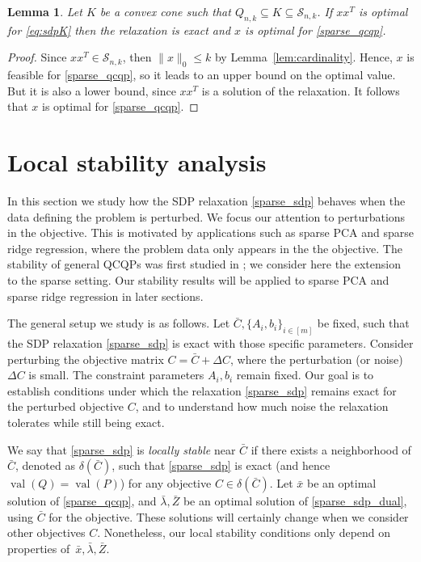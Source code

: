 \documentclass[11pt]{amsart}
\newcommand{\Szero}[2]{\ensuremath{\mathcal{S}_{#1,#2}}}
\theoremstyle{plain}
\newtheorem{lem}{Lemma}[section]
\theoremstyle{definition}
\theoremstyle{remark}
\DeclareMathOperator{\val}{val}
\begin{document}
	\begin{lem}
		Let $K$ be a convex cone such that $Q_{n,k} \subseteq K\subseteq \Szero{n}{k}$.
		If $x x^T$ is optimal for \eqref{eq:sdpK} then the relaxation is exact and $x$ is optimal for \eqref{sparse_qcqp}.
	\end{lem}
	
	\begin{proof}
		Since $x x^T \in \Szero{n}{k}$, then $\|x\|_0 \leq k$ by Lemma~\ref{lem:cardinality}.
		Hence, $x$ is feasible for \eqref{sparse_qcqp},
		so it leads to an upper bound on the optimal value.
		But it is also a lower bound, since $x x^T$ is a solution of the relaxation.
		It follows that $x$ is optimal for \eqref{sparse_qcqp}.
	\end{proof}
	
	\section{Local stability analysis}\label{section:stability}
	
	In this section we study how the SDP relaxation \eqref{sparse_sdp} behaves when the data defining the problem is perturbed.
	We focus our attention to perturbations in the objective.
	This is motivated by applications such as sparse PCA and sparse ridge regression, where the problem data only appears in the the objective.
	The stability of general QCQPs was first studied in \cite{cifuentes2022local};
	we consider here the extension to the sparse setting.
	Our stability results will be applied to sparse PCA and sparse ridge regression in later sections.
	
	The general setup we study is as follows.
	Let $\bar C, \{A_i,b_i\}_{i \in [m]}$ be fixed, such that the SDP relaxation \eqref{sparse_sdp} is exact with those specific parameters.
	Consider perturbing the objective matrix $C = \bar C + \Delta C$, where the perturbation (or noise) $\Delta C$ is small.
	The constraint parameters $A_i, b_i$ remain fixed.
	Our goal is to establish conditions under which the relaxation \eqref{sparse_sdp} remains exact for the perturbed objective $C$,
	and to understand how much noise the relaxation tolerates while still being exact.
	
	We say that \eqref{sparse_sdp} is \textit{locally stable} near $\bar C$ if there exists a neighborhood of \(\bar C\), denoted as \(\delta(\bar C)\), such that
	\eqref{sparse_sdp} is exact (and hence \(\val(Q) = \val(P)\))
	for any objective $C \in \delta(\bar C)$.
	Let $\bar x$ be an optimal solution of \eqref{sparse_qcqp},
	and $\bar\lambda, \bar Z$ be an optimal solution of \eqref{sparse_sdp_dual}, using $\bar C$ for the objective.
	These solutions will certainly change when we consider other objectives $C$.
	Nonetheless, our local stability conditions only depend on properties of~$\bar x, \bar\lambda, \bar Z$.
	
\end{document}

